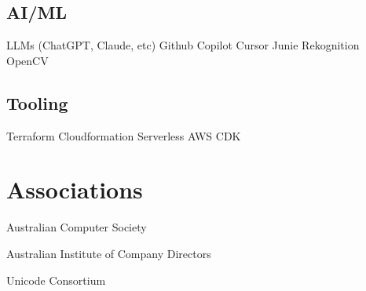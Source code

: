 \documentclass[]{tjd-cv}
\begin{document}
\begin{minipage}[t]{0.26\textwidth}
\vspace{8pt}
\subsection{AI/ML}
LLMs (ChatGPT, Claude, etc) \textbullet{}
Github Copilot \textbullet{}
Cursor \textbullet{}
Junie \textbullet{} 
Rekognition \textbullet{}
OpenCV

\vspace{8pt}
\subsection{Tooling}
Terraform \textbullet{}
Cloudformation \textbullet{}
Serverless \textbullet{}
AWS CDK

\sectionsep


\section{Associations}
\vspace{\topsep}
\begin{tightemize}
\item Australian Computer Society
\item Australian Institute of Company Directors
\item Unicode Consortium
\end{tightemize}


%
%

\end{minipage}
\hfill
\end{document}
